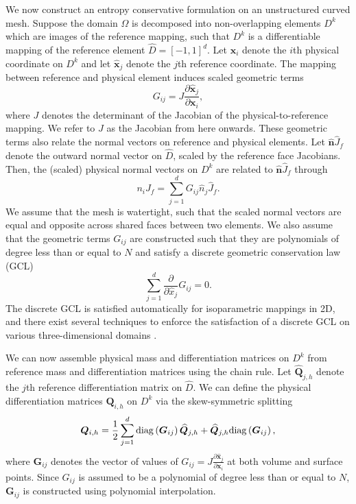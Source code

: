 \documentclass{svjour3}                     %
\renewcommand{\hat}{\widehat}
\newcommand{\diag}[1]{{\rm diag}\LRp{#1}}
\newcommand{\pd}[2]{\frac{\partial#1}{\partial#2}}
\newcommand{\LRp}[1]{\left( #1 \right)}
\begin{document}
We now construct an entropy conservative formulation on an unstructured curved mesh.  
Suppose the domain $\Omega$ is decomposed into non-overlapping elements $D^k$ which are images of the reference mapping, such that $D^k$ is a differentiable mapping of the reference element $\hat{D} = [-1,1]^d$.  Let $\bm{x}_i$ denote the $i$th physical coordinate on $D^k$ and let $\hat{\bm{x}}_j$ denote the $j$th reference coordinate.  The mapping between reference and physical element induces scaled geometric terms 
\[
G_{ij} = J\pd{\hat{\bm{x}}_j}{\bm{x}_i},
\]
where $J$ denotes the determinant of the Jacobian of the physical-to-reference mapping.  We refer to $J$ as the Jacobian from here onwards.
These geometric terms also relate the normal vectors on reference and physical elements.  Let $\hat{\bm{n}}\hat{J}_f$ denote the outward normal vector on $\hat{D}$, scaled by the reference face Jacobians.  Then, the (scaled) physical normal vectors on $D^k$ are related to $\hat{\bm{n}}\hat{J}_f$ through
\begin{equation}
{n}_iJ_f = \sum_{j=1}^d{G}_{ij}\hat{{n}}_j\hat{J}_f.
\label{eq:nJ_Gnhat}
\end{equation}
We assume that the mesh is watertight, such that the scaled normal vectors are equal and opposite across shared faces between two elements.  We also assume that the geometric terms ${G}_{ij}$ are constructed such that they are polynomials of degree less than or equal to $N$ and satisfy a discrete geometric conservation law (GCL)
\begin{equation}
\sum_{j=1}^d \pd{}{\hat{x}_j} G_{ij} = 0.
\label{eq:dgcl}
\end{equation}
The discrete GCL is satisfied automatically for isoparametric mappings in 2D, and there exist several techniques to enforce the satisfaction of a discrete GCL on various three-dimensional domains \cite{thomas1979geometric, kopriva2006metric, crean2018entropy, chan2018discretely, kozdon2018energy, kopriva2019free}.  

We can now assemble physical mass and differentiation matrices on $D^k$ from reference mass and differentiation matrices using the chain rule.  Let $\hat{\bm{Q}}_{j,h}$ denote the $j$th reference differentiation matrix on $\hat{D}$.  We can define the physical differentiation matrices $\bm{Q}_{i,h}$ on $D^k$ via the skew-symmetric splitting
\begin{equation}
\bm{Q}_{i,h} = \frac{1}{2}\sum_{j=1}^d \diag{\bm{G}_{ij}}\hat{\bm{Q}}_{j,h} + \hat{\bm{Q}}_{j,h} \diag{\bm{G}_{ij}},
\label{eq:curvedQ}
\end{equation}
where $\bm{G}_{ij}$ denotes the vector of values of $G_{ij} = J\pd{\hat{\bm{x}}_j}{\bm{x}_i}$ at both volume and surface points.  Since $G_{ij}$ is assumed to be a polynomial of degree less than or equal to $N$, $\bm{G}_{ij}$ is constructed using polynomial interpolation.
\end{document}
